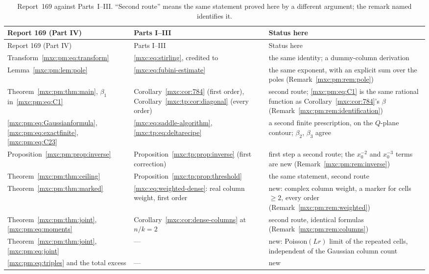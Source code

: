 \documentclass[11pt]{article}
\numberwithin{equation}{section}
\theoremstyle{definition}
\theoremstyle{remark}
\begin{document}
{\small
\renewcommand{\arraystretch}{1.12}
\setlength{\LTcapwidth}{\textwidth}
\begin{longtable}{@{}>{\raggedright\arraybackslash}p{}>{\raggedright\arraybackslash}p{}>{\raggedright\arraybackslash}p{}@{}}
\caption{Report~169 against Parts~I--III. ``Second route'' means the same
statement proved here by a different argument; the remark named identifies
it.}\label{mxc:pm:tab:claims}\\
\toprule
Report 169 (Part IV) & Parts I--III & Status here\\
\midrule
\endfirsthead
\toprule
Report 169 (Part IV) & Parts I--III & Status here\\
\midrule
\endhead
\bottomrule
\endfoot
Transform~\eqref{mxc:pm:eq:transform} & \eqref{mxc:eq:stirling}, credited to \cite[Proposition~29]{mpr2009} & the same identity; a dummy-column derivation\\
Lemma~\ref{mxc:pm:lem:pole} & \eqref{mxc:eq:fubini-estimate} & the same exponent, with an explicit sum over the poles (Remark~\ref{mxc:pm:rem:pole})\\
Theorem~\ref{mxc:pm:thm:main}, $\beta_1$ in~\eqref{mxc:pm:eq:C1} & Corollary~\ref{mxc:cor:784} (first order), Corollary~\ref{mxc:tp:cor:diagonal} (every order) & second route; \eqref{mxc:pm:eq:C1} is the same rational function as Corollary~\ref{mxc:cor:784}'s $\beta$ (Remark~\ref{mxc:pm:rem:identification})\\
\eqref{mxc:pm:eq:Gaussianformula}, \eqref{mxc:pm:eq:exactfinite}, \eqref{mxc:pm:eq:C23} & \eqref{mxc:eq:saddle-algorithm}, \eqref{mxc:tp:eq:deltarecipe} & a second finite prescription, on the $Q$-plane contour; $\beta_2$, $\beta_3$ agree\\
Proposition~\ref{mxc:pm:prop:inverse} & Proposition~\ref{mxc:tp:prop:inverse} (first correction) & first step a second route; the $x_0^{-2}$ and $x_0^{-3}$ terms are new (Remark~\ref{mxc:pm:rem:inverse})\\
Theorem~\ref{mxc:pm:thm:ceiling} & Proposition~\ref{mxc:tp:prop:threshold} & the same statement, second route\\
Theorem~\ref{mxc:pm:thm:marked} & \eqref{mxc:eq:weighted-dense}: real column weight, first order & new: complex column weight, a marker for cells $\ge2$, every order (Remark~\ref{mxc:pm:rem:weighted})\\
Theorem~\ref{mxc:pm:thm:joint}, \eqref{mxc:pm:eq:moments} & Corollary~\ref{mxc:cor:dense-columns} at $n/k=2$ & second route, identical formulas (Remark~\ref{mxc:pm:rem:columns})\\
Theorem~\ref{mxc:pm:thm:joint}, \eqref{mxc:pm:eq:joint} & --- & new: Poisson$(Lr)$ limit of the repeated cells, independent of the Gaussian column count\\
\eqref{mxc:pm:eq:triples} and the total excess & --- & new\\
\end{longtable}
}
\end{document}
